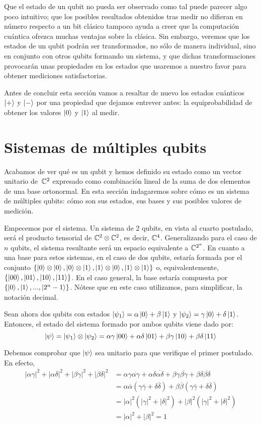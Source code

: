 Que el estado de un qubit no pueda ser observado como tal puede parecer algo poco intuitivo; que los posibles resultados obtenidos tras medir no difieran en número respecto a un bit clásico tampoco ayuda a creer que la computación cuántica ofrezca muchas ventajas sobre la clásica. Sin embargo, veremos que los estados de un qubit podrán ser transformados, no sólo de manera individual, sino en conjunto con otros qubits formando un sistema, y que dichas transformaciones provocarán unas propiedades en los estados que usaremos a nuestro favor para obtener mediciones satisfactorias.

Antes de concluir esta sección vamos a resaltar de nuevo los estados cuánticos $\left|+\right\rangle$ y $\left|-\right\rangle$ por una propiedad que dejamos entrever antes: la  equiprobabilidad de obtener los valores $\left|0\right\rangle$ y $\left|1\right\rangle$ al medir.


\section{Sistemas de múltiples qubits}

Acabamos de ver qué es un qubit y hemos definido su estado como un vector unitario de~$\mathbb{C}^2$ expresado como combinación lineal de la suma de dos elementos de una base ortonormal. En esta sección indagaremos sobre cómo es un sistema de múltiples qubits: cómo son sus estados, sus bases y sus posibles valores de medición.

Empecemos por el sistema. Un sistema de 2 qubits, en vista al cuarto postulado, será el producto tensorial de $\mathbb{C}^2\otimes\mathbb{C}^2$, es decir, $\mathbb{C}^4$. Generalizando para el caso de $n$ qubits, el sistema resultante será un espacio equivalente a $\mathbb{C}^{2^n}$. En cuanto a una base para estos sistemas, en el caso de dos qubits, estaría formada por el conjunto $\{\left|0\right\rangle\otimes\left|0\right\rangle,\left|0\right\rangle\otimes\left|1\right\rangle,\left|1\right\rangle\otimes\left|0\right\rangle,\left|1\right\rangle\otimes\left|1\right\rangle\}$ o, equivalentemente, $\{\left|00\right\rangle,\left|01\right\rangle,\left|10\right\rangle,\left|11\right\rangle\}$. En el caso general, la base estaría compuesta por $\{\left|0\right\rangle,\left|1\right\rangle,...,\left|2^n-1\right\rangle\}$. Nótese que en este caso utilizamos, para simplificar, la notación decimal.

Sean ahora dos qubits con estados $\left|\psi_1\right\rangle=\alpha\left|0\right\rangle+\beta\left|1\right\rangle$ y $\left|\psi_2\right\rangle=\gamma\left|0\right\rangle+\delta\left|1\right\rangle$. Entonces, el estado del sistema formado por ambos qubits viene dado por:
\[\left|\psi\right\rangle=\left|\psi_1\right\rangle\otimes\left|\psi_2\right\rangle=\alpha\gamma\left|00\right\rangle+\alpha\delta\left|01\right\rangle+\beta\gamma\left|10\right\rangle+\beta\delta\left|11\right\rangle\]

Debemos comprobar que $\left|\psi\right\rangle$ sea unitario para que verifique el primer postulado. En efecto,
\[
\begin{split}
|\alpha\gamma|^2+|\alpha\delta|^2+|\beta\gamma|^2+|\beta\delta|^2&=\alpha\gamma\overline{\alpha\gamma}+\alpha\delta\overline{\alpha\delta}+\beta\gamma\overline{\beta\gamma}+\beta\delta\overline{\beta\delta}\\
&=\alpha\overline{\alpha}(\gamma\overline{\gamma}+\delta\overline{\delta})+\beta\overline{\beta}(\gamma\overline{\gamma}+\delta\overline{\delta})\\
&=|\alpha|^2(|\gamma|^2+|\delta|^2)+|\beta|^2(|\gamma|^2+|\delta|^2)\\
&=|\alpha|^2+|\beta|^2=1
\end{split}
\]

